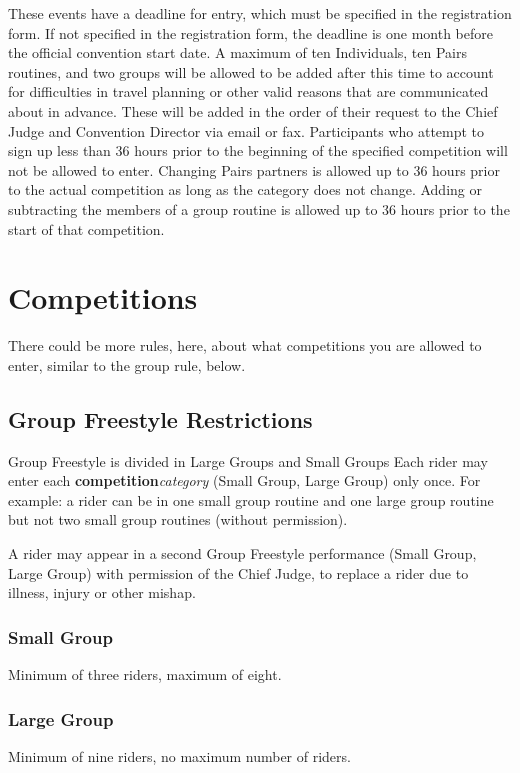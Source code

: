 These events have a deadline for entry, which must be specified in the registration form.
If not specified in the registration form, the deadline is one month before the official convention start date.
A maximum of ten Individuals, ten Pairs routines, and two groups will be allowed to be added after this time to account for difficulties in travel planning or other valid reasons that are communicated about in advance.
These will be added in the order of their request to the Chief Judge and Convention Director via email or fax.
Participants who attempt to sign up less than 36 hours prior to the beginning of the specified competition will not be allowed to enter.
Changing Pairs partners is allowed up to 36 hours prior to the actual competition as long as the category does not change.
Adding or subtracting the members of a group routine is allowed up to 36 hours prior to the start of that competition.

\section{Competitions}

\begin{framed}
There could be more rules, here, about what competitions you are allowed
to enter, similar to the group rule, below.
\end{framed}

\subsection{Group Freestyle Restrictions}
Group Freestyle is divided in Large Groups and Small Groups 
Each rider may enter each \textbf{competition}\textit{category} (Small Group, Large Group) only once. For example: a rider can be in one small group routine and one large group routine but not two small group routines (without permission).

A rider may appear in a second Group Freestyle performance (Small Group, Large Group) with permission of the Chief Judge, to replace a rider due to illness, injury or other mishap. 

\subsubsection{Small Group}
Minimum of three riders, maximum of eight.

\subsubsection{Large Group}
Minimum of nine riders, no maximum number of riders.

